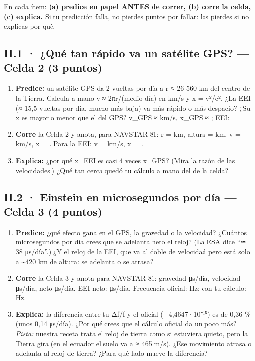 En cada ítem: \textbf{(a) predice en papel ANTES de correr, (b) corre la celda, (c) explica.} Si tu predicción falla, no pierdes puntos por fallar: los pierdes si no explicas por qué.

\subsection{II.1 · ¿Qué tan rápido va un satélite GPS? --- Celda 2 (3 puntos)}

\begin{enumerate}
\def\labelenumi{\alph{enumi})}
\item
  \textbf{Predice:} un satélite GPS da 2 vueltas por día a r ≈ 26 560 km del centro de la Tierra. Calcula a mano v ≈ 2πr/(medio día) en km/s y x = v²/c². ¿La EEI (≈ 15,5 vueltas por día, mucho más baja) va más rápido o más despacio? ¿Su x es mayor o menor que el del GPS?
  v\_GPS ≈  km/s, x\_GPS ≈  ; EEI: 
\item
  \textbf{Corre} la Celda 2 y anota, para NAVSTAR 81: r =  km, altura =  km, v =  km/s, x =  . Para la EEI: v =  km/s, x =  .
\item
  \textbf{Explica:} ¿por qué x\_EEI es casi 4 veces x\_GPS? (Mira la razón de las velocidades.) ¿Qué tan cerca quedó tu cálculo a mano del de la celda?
\end{enumerate}

\subsection{II.2 · Einstein en microsegundos por día --- Celda 3 (4 puntos)}

\begin{enumerate}
\def\labelenumi{\alph{enumi})}
\item
  \textbf{Predice:} ¿qué efecto gana en el GPS, la gravedad o la velocidad? ¿Cuántos microsegundos por día crees que se adelanta neto el reloj? (La ESA dice ``≃ 38 μs/día''.) ¿Y el reloj de la EEI, que va al doble de velocidad pero está solo a \textasciitilde420 km de altura: se adelanta o se atrasa?
\item
  \textbf{Corre} la Celda 3 y anota para NAVSTAR 81: gravedad  μs/día, velocidad  μs/día, neto  μs/día. EEI neto:  μs/día. Frecuencia oficial:  Hz; con tu cálculo:  Hz.
\item
  \textbf{Explica:} la diferencia entre tu Δf/f y el oficial (−4,4647·10⁻¹⁰) es de 0,36 \% (unos 0,14 μs/día). ¿Por qué crees que el cálculo oficial da un poco más? \emph{Pista:} nuestra receta trata el reloj de tierra como si estuviera quieto, pero la Tierra gira (en el ecuador el suelo va a ≈ 465 m/s). ¿Ese movimiento atrasa o adelanta al reloj de tierra? ¿Para qué lado mueve la diferencia?
\end{enumerate}

